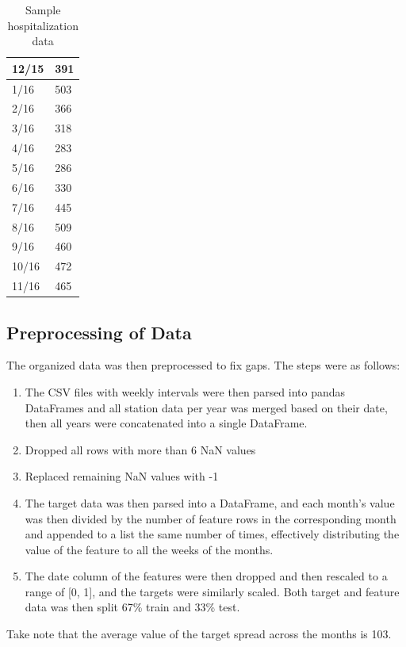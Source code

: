 \documentclass[10pt,11pt,12pt,oneside]{book}
\begin{document}
\begin{table}[H]
{\begin{tabular}{|l|l|}
\hline
12/15 & 391     \\
\hline
1/16  & 503     \\
\hline
2/16  & 366     \\
\hline
3/16  & 318     \\
\hline
4/16  & 283     \\
\hline
5/16  & 286     \\
\hline
6/16  & 330     \\
\hline
7/16  & 445     \\
\hline
8/16  & 509     \\
\hline
9/16  & 460     \\
\hline
10/16 & 472     \\
\hline
11/16 & 465     \\
\hline

\end{tabular}
\caption{Sample hospitalization data}
\label{table:data_csv2}
}
\end{table}

    \subsection{Preprocessing of Data}
    The organized data was then preprocessed to fix gaps. The steps were as follows:
    \begin{enumerate}
        \item The CSV files with weekly intervals were then parsed into pandas DataFrames and all station data per year was merged based on their date, then all years were concatenated into a single DataFrame.
        \item Dropped all rows with more than 6 NaN values
        \item Replaced remaining NaN values with -1
        \item The target data was then parsed into a DataFrame, and each month's value was then divided by the number of feature rows in the corresponding month and appended
to a list the same number of times, effectively distributing the value of the feature to all the weeks of the months.
        \item The date column of the features were then dropped and then rescaled to a range of [0, 1], and the targets were similarly scaled. Both target and feature data was then split 67\% train and 33\%  test. 
    \end{enumerate}
    Take note that the average value of the target spread across the months is 103.
    \pagebreak
\end{document}
